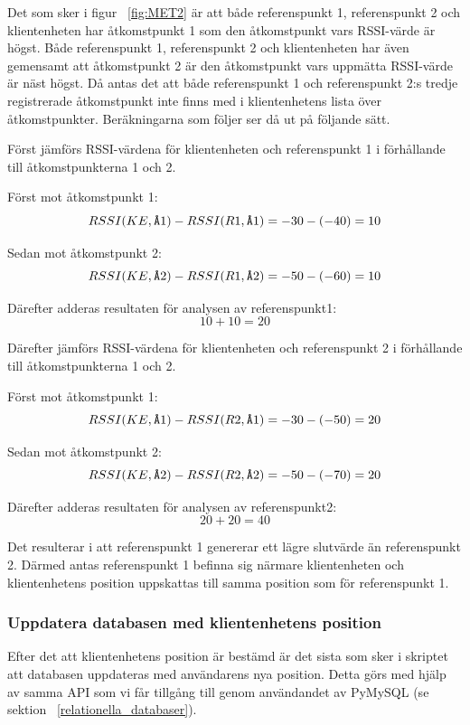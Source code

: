 \documentclass[a4paper,12pt]{article}
\begin{document}
 Det som sker i figur ~\ref{fig:MET2} är att både referenspunkt 1, referenspunkt 2 och klientenheten har åtkomstpunkt 1 som den åtkomstpunkt vars RSSI-värde är högst. Både referenspunkt 1, referenspunkt 2 och klientenheten har även gemensamt att åtkomstpunkt 2 är den åtkomstpunkt vars uppmätta RSSI-värde är näst högst. Då antas det att både referenspunkt 1 och referenspunkt 2:s tredje registrerade åtkomstpunkt inte finns med i klientenhetens lista över åtkomstpunkter. Beräkningarna som följer ser då ut på följande sätt.

 Först jämförs RSSI-värdena för klientenheten och referenspunkt 1 i förhållande till åtkomstpunkterna 1 och 2.

 Först mot åtkomstpunkt 1: $$ RSSI (KE,\verb|Å|1)  -  RSSI (R1,\verb|Å|1) = -30 - (- 40) = 10 $$

 Sedan mot åtkomstpunkt 2: $$ RSSI (KE,\verb|Å|2)  -  RSSI (R1,\verb|Å|2) = -50 - (- 60) = 10 $$

 Därefter adderas resultaten för analysen av referenspunkt1: $$ 10 + 10 = 20$$

 Därefter jämförs RSSI-värdena för klientenheten och referenspunkt 2 i förhållande till åtkomstpunkterna 1 och 2.

 Först mot åtkomstpunkt 1: $$ RSSI (KE,\verb|Å|1)  -  RSSI (R2,\verb|Å|1) = -30 - (- 50) = 20 $$

 Sedan mot åtkomstpunkt 2: $$ RSSI (KE,\verb|Å|2)  -  RSSI (R2,\verb|Å|2) = -50 - (- 70) = 20 $$

 Därefter adderas resultaten för analysen av referenspunkt2: $$ 20 + 20 = 40$$

 Det resulterar i att referenspunkt 1 genererar ett lägre slutvärde än referenspunkt 2. Därmed antas referenspunkt 1 befinna sig närmare klientenheten och klientenhetens position uppskattas till samma position som för referenspunkt 1.

 \subsubsection{Uppdatera databasen med klientenhetens position}
 Efter det att klientenhetens position är bestämd är det sista som sker i skriptet att databasen uppdateras med användarens nya position. Detta görs med hjälp av samma API som vi får tillgång till genom användandet av PyMySQL (se sektion ~\ref{relationella_databaser}).
\end{document}
